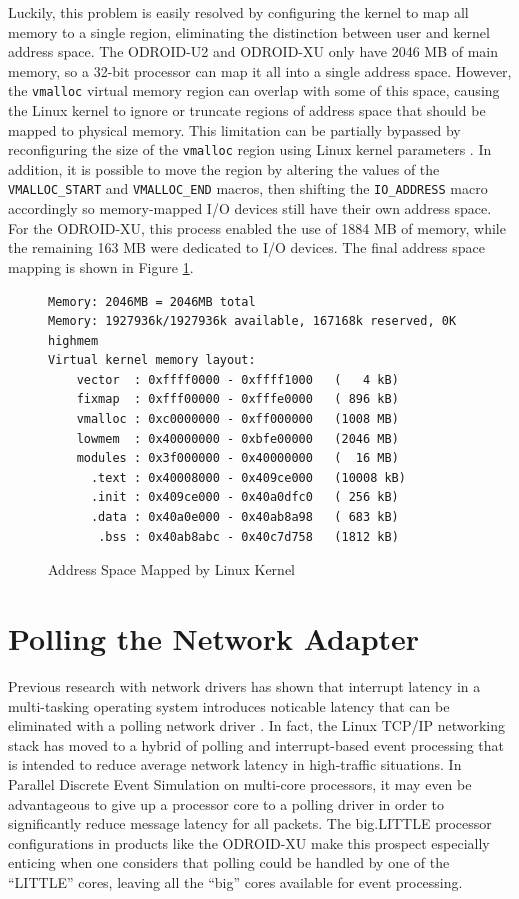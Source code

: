 \documentclass[11pt]{book}
\begin{document}
Luckily, this problem is easily resolved by configuring the kernel to map all memory to a
single region, eliminating the distinction between user and kernel address space.  The
ODROID-U2 and ODROID-XU only have 2046 MB of main memory, so a 32-bit processor can map it
all into a single address space.  However, the \verb;vmalloc; virtual memory region can
overlap with some of this space, causing the Linux kernel to ignore or truncate regions of
address space that should be mapped to physical memory.  This limitation can be partially
bypassed by reconfiguring the size of the \verb;vmalloc; region using Linux kernel
parameters \cite{vmalloc-overlap}.  In addition, it is possible to move the region by
altering the values of the \verb;VMALLOC_START; and \verb;VMALLOC_END; macros, then
shifting the \verb;IO_ADDRESS; macro accordingly so memory-mapped I/O devices still have
their own address space.  For the ODROID-XU, this process enabled the use of 1884 MB of
memory, while the remaining 163 MB were dedicated to I/O devices.  The final address space
mapping is shown in Figure \ref{addrmap}.

\begin{figure}
\begin{center}
\begin{verbatim}
Memory: 2046MB = 2046MB total
Memory: 1927936k/1927936k available, 167168k reserved, 0K highmem
Virtual kernel memory layout:
    vector  : 0xffff0000 - 0xffff1000   (   4 kB)
    fixmap  : 0xfff00000 - 0xfffe0000   ( 896 kB)
    vmalloc : 0xc0000000 - 0xff000000   (1008 MB)
    lowmem  : 0x40000000 - 0xbfe00000   (2046 MB)
    modules : 0x3f000000 - 0x40000000   (  16 MB)
      .text : 0x40008000 - 0x409ce000   (10008 kB)
      .init : 0x409ce000 - 0x40a0dfc0   ( 256 kB)
      .data : 0x40a0e000 - 0x40ab8a98   ( 683 kB)
       .bss : 0x40ab8abc - 0x40c7d758   (1812 kB)
\end{verbatim}
\end{center}
\caption{Address Space Mapped by Linux Kernel}
\label{addrmap}
\end{figure}

\section{Polling the Network Adapter}

Previous research with network drivers has shown that interrupt latency in a multi-tasking
operating system introduces noticable latency that can be eliminated with a polling
network driver \cite{dovrolis-01,liu-09}.  In fact, the Linux TCP/IP networking stack has
moved to a hybrid of polling and interrupt-based event processing that is intended to
reduce average network latency in high-traffic situations.  In Parallel Discrete Event
Simulation on multi-core processors, it may even be advantageous to give up a processor
core to a polling driver in order to significantly reduce message latency for all packets.
The big.LITTLE processor configurations in products like the ODROID-XU make this prospect
especially enticing when one considers that polling could be handled by one of the
``LITTLE'' cores, leaving all the ``big'' cores available for event processing.
\end{document}
